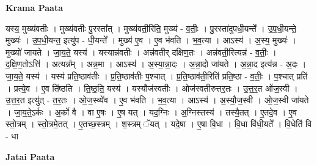 \documentclass[17pt]{extarticle}
\begin{document}
\textbf{Krama Paata} \newline

यस्य॒ मुख्य॑वतीः । मुख्य॑वतीः पु॒रस्ता᳚त् । मुख्य॑वती॒रिति॒ मुख्य॑ - व॒तीः॒ । पु॒रस्ता॑दुपधी॒यन्ते᳚ । उ॒प॒धी॒यन्ते॒ मुख्यः॑ । उ॒प॒धी॒यन्त॒ इत्यु॑प - धी॒यन्ते᳚ । मुख्य॑ ए॒व । ए॒व भ॑वति । भ॒व॒त्या । आऽस्य॑ । अ॒स्य॒ मुख्यः॑ । मुख्यो॑ जायते । जा॒य॒ते॒ यस्य॑ । यस्यान्न॑वतीः । अन्न॑वतीर् दक्षिण॒तः । अन्न॑वती॒रित्यन्न॑ - व॒तीः॒ । द॒क्षि॒ण॒तोऽत्ति॑ । अत्यन्न᳚म् । अन्न॒मा । आऽस्य॑ । अ॒स्या॒न्ना॒दः । अ॒न्ना॒दो जा॑यते । अ॒न्ना॒द इत्य॑न्न - अ॒दः । जा॒य॒ते॒ यस्य॑ । यस्य॑ प्रति॒ष्ठाव॑तीः । प्र॒ति॒ष्ठाव॑तीः प॒श्चात् । प्र॒ति॒ष्ठाव॑ती॒रिति॑ प्रति॒ष्ठा - व॒तीः॒ । प॒श्चात् प्रति॑ । प्रत्ये॒व । ए॒व ति॑ष्ठति । ति॒ष्ठ॒ति॒ यस्य॑ । यस्यौज॑स्वतीः । ओज॑स्वतीरुत्तर॒तः । उ॒त्त॒र॒त ओ॑ज॒स्वी । उ॒त्त॒र॒त इत्यु॑त् - त॒र॒तः । ओ॒ज॒स्व्ये॑व । ए॒व भ॑वति । भ॒व॒त्या । आऽस्य॑ । अ॒स्यौ॒ज॒स्वी । ओ॒ज॒स्वी जा॑यते । जा॒य॒ते॒ऽर्कः । अ॒र्को वै । वा ए॒षः । ए॒ष यत् । यद॒ग्निः । अ॒ग्निस्तस्य॑ । तस्यै॒तत् । ए॒तदे॒व । ए॒व स्तो॒त्रम् । स्तो॒त्रमे॒तत् । ए॒तच्छ॒स्त्रम् । श॒स्त्रम् ॅयत् । यदे॒षा । ए॒षा वि॒धा । वि॒धा वि॑धी॒यते᳚ । वि॒धेति॑ वि - धा \newline

\textbf{Jatai Paata} \newline
\end{document}
